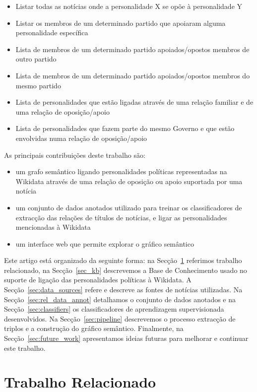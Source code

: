 \documentclass[a4paper, twocolumn, 11pt, twoside]{article}
\begin{document}
\begin{itemize}
\item{Listar todas as notícias onde a personalidade X se opõe à personalidade Y}
\item{Listar os membros de um determinado partido que apoiaram alguma personalidade específica}
\item{Lista de membros de um determinado partido apoiados/opostos membros de outro partido}
\item{Lista de membros de um determinado partido apoiados/opostos membros do mesmo partido}
\item{Lista de personalidades que estão ligadas através de uma relação familiar e de uma relação de oposição/apoio}
\item{Lista de personalidades que fazem parte do mesmo Governo e que estão envolvidas numa relação de oposição/apoio}
\end{itemize}

As principais contribuições deste trabalho são: 

\begin{itemize}
\item{um grafo semântico ligando personalidades políticas representadas na Wikidata através de uma relação de oposição ou apoio suportada por uma notícia}
\item{um conjunto de dados anotados utilizado para treinar os classificadores de extracção das relações de títulos de notícias, e ligar as personalidades mencionadas à Wikidata}
\item{um interface web que permite explorar o gráfico semântico}
\end{itemize}

Este artigo está organizado da seguinte forma: na Secção~\ref{sec_related_work} referimos trabalho relacionado, na Secção~\ref{sec_kb} descrevemos a Base de Conhecimento usado no suporte de ligação das personalidades políticas à Wikidata. A Secção~\ref{sec:data_sources} refere e descreve as fontes de notícias utilizadas. Na Secção~\ref{sec:rel_data_annot} detalhamos o conjunto de dados anotados e na Secção~\ref{sec:classifiers} os classificadores de aprendizagem supervisionada desenvolvidos. Na Secção~\ref{sec:pipeline} descrevemos o processo extracção de triplos e a construção do gráfico semântico. Finalmente, na Secção~\ref{sec:future_work} apresentamos ideias futuras para melhorar e continuar este trabalho.

\section{Trabalho Relacionado}
\label{sec_related_work}
\end{document}
